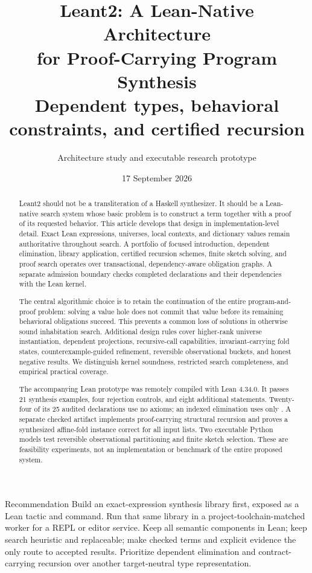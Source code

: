 \documentclass[11pt,letterpaper]{article}
\title{\textbf{Leant2: A Lean-Native Architecture\\for Proof-Carrying Program Synthesis}\\[7pt]
\large Dependent types, behavioral constraints, and certified recursion}
\author{Architecture study and executable research prototype}
\date{17 September 2026}
\newcommand{\code}[1]{\texttt{\detokenize{#1}}}
\theoremstyle{definition}\newtheorem{definition}[theorem]{Definition}
\theoremstyle{remark}\newtheorem{remark}[theorem]{Remark}
\begin{document}
\maketitle
\begin{abstract}
Leant2 should not be a transliteration of a Haskell synthesizer. It should be a
Lean-native search system whose basic problem is to construct a term together
with a proof of its requested behavior. This article develops that design in
implementation-level detail. Exact Lean expressions, universes, local contexts,
and dictionary values remain authoritative throughout search. A portfolio of
focused introduction, dependent elimination, library application, certified
recursion schemes, finite sketch solving, and proof search operates over
transactional, dependency-aware obligation graphs. A separate admission boundary
checks completed declarations and their dependencies with the Lean kernel.

The central algorithmic choice is to retain the continuation of the entire
program-and-proof problem: solving a value hole does not commit that value before
its remaining behavioral obligations succeed. This prevents a common loss of
solutions in otherwise sound inhabitation search. Additional design rules cover
higher-rank universe instantiation, dependent projections, recursive-call
capabilities, invariant-carrying fold states, counterexample-guided refinement,
reversible observational buckets, and honest negative results. We distinguish
kernel soundness, restricted search completeness, and empirical practical coverage.

The accompanying Lean prototype was remotely compiled with Lean 4.34.0. It passes
21 synthesis examples, four rejection controls, and eight additional statements.
Twenty-four of its 25 audited declarations use no axioms; an indexed elimination
uses only \code{propext}. A separate checked artifact implements proof-carrying
structural recursion and proves a synthesized affine-fold instance correct for
all input lists. Two executable Python models test reversible observational
partitioning and finite sketch selection. These are feasibility experiments, not
an implementation or benchmark of the entire proposed system.
\end{abstract}

\begin{designbox}{Recommendation}
Build an exact-expression synthesis library first, exposed as a Lean tactic and
command. Run that same library in a project-toolchain-matched worker for a REPL
or editor service. Keep all semantic components in Lean; keep search heuristic
and replaceable; make checked terms and explicit evidence the only route to
accepted results. Prioritize dependent elimination and contract-carrying
recursion over another target-neutral type representation.
\end{designbox}
\clearpage
\setcounter{tocdepth}{1}
\tableofcontents
\clearpage
\end{document}
